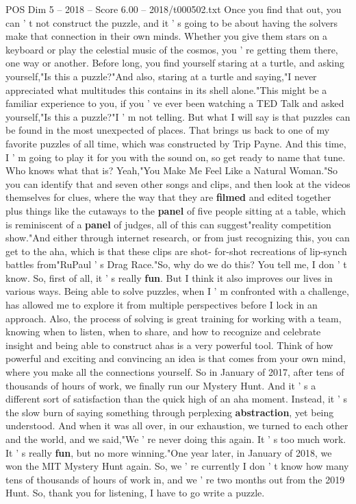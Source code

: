 \begin{textsample}{POS Dim 5 – 2018 – Score 6.00 – 2018/t000502.txt}
Once you find that out, you can ' t not construct the puzzle, and it ' s going to be about having the solvers make that connection in their own minds.
Whether you give them stars on a keyboard or play the celestial music of the cosmos, you ' re getting them there, one way or another.
Before long, you find yourself staring at a turtle, and asking yourself,"Is this a puzzle?"And also, staring at a turtle and saying,"I never appreciated what multitudes this contains in its shell alone."This might be a familiar experience to you, if you ' ve ever been watching a TED Talk and asked yourself,"Is this a puzzle?"I ' m not telling.
But what I will say is that puzzles can be found in the most unexpected of places.
That brings us back to one of my favorite puzzles of all time, which was constructed by Trip Payne.
And this time, I ' m going to play it for you with the sound on, so get ready to name that tune.
Who knows what that is?
Yeah,"You Make Me Feel Like a Natural Woman."So you can identify that and seven other songs and clips, and then look at the videos themselves for clues, where the way that they are \textbf{filmed} and edited together plus things like the cutaways to the \textbf{panel} of five people sitting at a table, which is reminiscent of a \textbf{panel} of judges, all of this can suggest"reality competition show."And either through internet research, or from just recognizing this, you can get to the aha, which is that these clips are shot- for-shot recreations of lip-synch battles from"RuPaul ' s Drag Race."So, why do we do this?
You tell me, I don ' t know.
So, first of all, it ' s really \textbf{fun}.
But I think it also improves our lives in various ways.
Being able to solve puzzles, when I ' m confronted with a challenge, has allowed me to explore it from multiple perspectives before I lock in an approach.
Also, the process of solving is great training for working with a team, knowing when to listen, when to share, and how to recognize and celebrate insight and being able to construct ahas is a very powerful tool.
Think of how powerful and exciting and convincing an idea is that comes from your own mind, where you make all the connections yourself.
So in January of 2017, after tens of thousands of hours of work, we finally run our Mystery Hunt.
And it ' s a different sort of satisfaction than the quick high of an aha moment.
Instead, it ' s the slow burn of saying something through perplexing \textbf{abstraction}, yet being understood.
And when it was all over, in our exhaustion, we turned to each other and the world, and we said,"We ' re never doing this again.
It ' s too much work.
It ' s really \textbf{fun}, but no more winning."One year later, in January of 2018, we won the MIT Mystery Hunt again.
So, we ' re currently I don ' t know how many tens of thousands of hours of work in, and we ' re two months out from the 2019 Hunt.
So, thank you for listening, I have to go write a puzzle.

\end{textsample}
